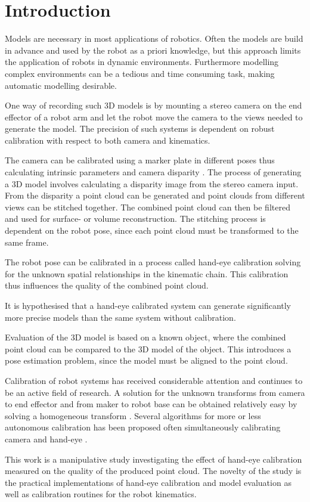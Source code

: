 \chapter{Introduction}

Models are necessary in most applications of robotics. Often the models are build in advance and used by the robot as a priori knowledge, but this approach limits the application of robots in dynamic environments. Furthermore modelling complex environments can be a tedious and time consuming task, making automatic modelling desirable. 

One way of recording such 3D models is by mounting a stereo camera on the end effector of a robot arm and let the robot move the camera to the views needed to generate the model. The precision of such systems is dependent on robust calibration with respect to both camera and kinematics.

The camera can be calibrated using a marker plate in different poses thus calculating intrinsic parameters and camera disparity \cite{Zhang1999,Zhang2000}. The process of generating a 3D model involves calculating a disparity image from the stereo camera input. From the disparity a point cloud can be generated and point clouds from different views can be stitched together. The combined point cloud can then be filtered and used for surface- or volume reconstruction. The stitching process is dependent on the robot pose, since each point cloud must be transformed to the same frame.

The robot pose can be calibrated in a process called hand-eye calibration solving for the unknown spatial relationships in the kinematic chain. This calibration thus influences the quality of the combined point cloud.

It is hypothesised that a hand-eye calibrated system can generate significantly more precise models than the same system without calibration.

Evaluation of the 3D model is based on a known object, where the combined point cloud can be compared to the 3D model of the object. This introduces a pose estimation problem, since the model must be aligned to the point cloud. 

Calibration of robot systems has received considerable attention and continues to be an active field of research. A solution for the unknown transforms from camera to end effector and from maker to robot base can be obtained relatively easy by solving a homogeneous transform \cite{Shiu1989}. Several algorithms for more or less autonomous calibration has been proposed \cite{Tsai1988, Tsai1989} often simultaneously calibrating camera and hand-eye \cite{Malm2003, Zhao2008, Jordt2009}.

This work is a manipulative study investigating the effect of hand-eye calibration measured on the quality of the produced point cloud. The novelty of the study is the practical implementations of hand-eye calibration and model evaluation as well as calibration routines for the robot kinematics.


%